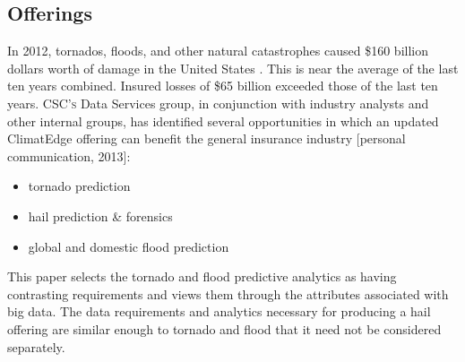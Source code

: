 \subsection{Offerings}
In 2012, tornados, floods, and other natural catastrophes caused \$160  billion dollars worth of damage in the United States \cite{stalder}. This is near the average of the last ten years combined. Insured losses of \$65 billion exceeded those of the last ten years. \textsc{CSC's} Data Services group, in conjunction with industry analysts and other internal groups, has identified several opportunities  in which an updated ClimatEdge\texttrademark{} offering can benefit the general insurance industry [personal communication, 2013]:
\begin{itemize}
    \item tornado prediction
    \item hail prediction \& forensics
    \item global and domestic flood prediction
\end{itemize}
This paper selects the tornado and flood predictive analytics as having contrasting requirements and views them through the attributes associated with big data. The data requirements and analytics necessary for producing a hail offering are similar enough to tornado and flood that it need not be considered separately.